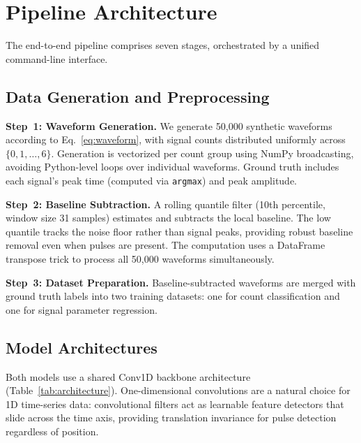 \documentclass[11pt,twocolumn]{article}
\begin{document}
\section{Pipeline Architecture}
\label{sec:pipeline}

The end-to-end pipeline comprises seven stages, orchestrated by a unified command-line interface.

\subsection{Data Generation and Preprocessing}

\textbf{Step~1: Waveform Generation.}
We generate 50{,}000 synthetic waveforms according to Eq.~\eqref{eq:waveform}, with signal counts distributed uniformly across $\{0, 1, \ldots, 6\}$.
Generation is vectorized per count group using NumPy broadcasting, avoiding Python-level loops over individual waveforms.
Ground truth includes each signal's peak time (computed via \texttt{argmax}) and peak amplitude.

\textbf{Step~2: Baseline Subtraction.}
A rolling quantile filter (10th percentile, window size 31 samples) estimates and subtracts the local baseline.
The low quantile tracks the noise floor rather than signal peaks, providing robust baseline removal even when pulses are present.
The computation uses a DataFrame transpose trick to process all 50{,}000 waveforms simultaneously.

\textbf{Step~3: Dataset Preparation.}
Baseline-subtracted waveforms are merged with ground truth labels into two training datasets: one for count classification and one for signal parameter regression.

\subsection{Model Architectures}

Both models use a shared Conv1D backbone architecture (Table~\ref{tab:architecture}).
One-dimensional convolutions are a natural choice for 1D time-series data: convolutional filters act as learnable feature detectors that slide across the time axis, providing translation invariance for pulse detection regardless of position.
\end{document}
